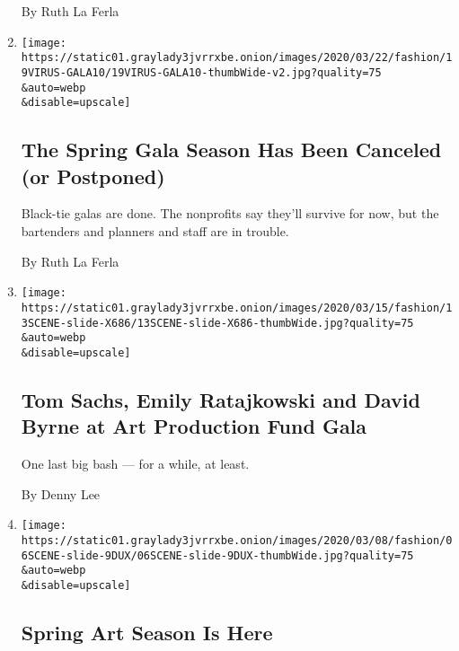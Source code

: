 \begin{enumerate}
  By Ruth La Ferla
\item
  \href{/2020/03/19/fashion/gala-philanthropy-charity-parties-canceled-coronavirus.html}{}

  \texttt{[image: https://static01.graylady3jvrrxbe.onion/images/2020/03/22/fashion/19VIRUS-GALA10/19VIRUS-GALA10-thumbWide-v2.jpg?quality=75\\\&auto=webp\\\&disable=upscale]}

  \hypertarget{the-spring-gala-season-has-been-canceled-or-postponed}{%
  \subsection{The Spring Gala Season Has Been Canceled (or
  Postponed)}\label{the-spring-gala-season-has-been-canceled-or-postponed}}

  Black-tie galas are done. The nonprofits say they'll survive for now,
  but the bartenders and planners and staff are in trouble.

  By Ruth La Ferla
\item
  \href{/slideshow/2020/03/13/fashion/tom-sachs-emily-ratajkowski-and-david-byrne-at-art-production-fund-gala.html}{}

  \texttt{[image: https://static01.graylady3jvrrxbe.onion/images/2020/03/15/fashion/13SCENE-slide-X686/13SCENE-slide-X686-thumbWide.jpg?quality=75\\\&auto=webp\\\&disable=upscale]}

  \hypertarget{tom-sachs-emily-ratajkowski-and-david-byrne-at-art-production-fund-gala}{%
  \subsection{Tom Sachs, Emily Ratajkowski and David Byrne at Art
  Production Fund
  Gala}\label{tom-sachs-emily-ratajkowski-and-david-byrne-at-art-production-fund-gala}}

  One last big bash --- for a while, at least.

  By Denny Lee
\item
  \href{/2020/03/06/style/spring-art-season-is-here.html}{}

  \texttt{[image: https://static01.graylady3jvrrxbe.onion/images/2020/03/08/fashion/06SCENE-slide-9DUX/06SCENE-slide-9DUX-thumbWide.jpg?quality=75\\\&auto=webp\\\&disable=upscale]}

  \hypertarget{spring-art-season-is-here}{%
  \subsection{Spring Art Season Is
  Here}\label{spring-art-season-is-here}}


\end{enumerate}
